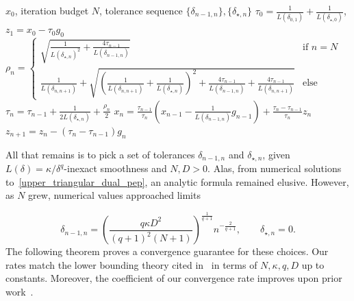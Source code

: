 \documentclass[11pt, hidelinks]{article}
\numberwithin{equation}{section}
\theoremstyle{thmstyletwo}%
\numberwithin{equation}{section}
\begin{document}
\begin{algorithm}[h]
\caption{Inexactly Smooth Optimized Gradient Method}\label{alg:IS-OGM}
\begin{algorithmic}
\Input $x_0$, iteration budget $N$, tolerance sequence $\{\delta_{n-1,n}\}, \{\delta_{\star,n}\}$
\Initialize  $\tau_0 = \frac{1}{L(\delta_{0,1})}+\frac{1}{L(\delta_{\star,0})}$, $z_1 = x_0-\tau_0 g_0$
    \State $\rho_n =  \begin{cases} 
   \sqrt{\frac{1}{L(\delta_{\star,n})^2}+\frac{4\tau_{n-1}}{L(\delta_{n-1,n})}} & \text{if } n = N  \\[1em]
 \frac{1}{L(\delta_{n,n+1})}+\sqrt{\left(\frac{1}{L(\delta_{n,n+1})}+\frac{1}{L(\delta_{\star,n})}\right)^2+\frac{4\tau_{n-1}}{L(\delta_{n-1,n})}+\frac{4\tau_{n-1}}{L(\delta_{n,n+1})}} & \text{else} 
    \end{cases}$
    \State $\tau_n = \tau_{n-1} + \frac{1}{2L(\delta_{\star,n})}+\frac{\rho_n}{2}$
    \State $x_n = \frac{\tau_{n-1}}{\tau_n}\left(x_{n-1}-\frac{1}{L(\delta_{n-1,n})}g_{n-1}\right) + \frac{\tau_n-\tau_{n-1}}{\tau_n}z_n$
    \State $z_{n+1} = z_n - (\tau_n-\tau_{n-1})g_n$
\EndFor
\end{algorithmic}
\end{algorithm}





All that remains is to pick a set of tolerances $\delta_{n-1,n}$ and $\delta_{\star, n}$, given $L(\delta) = \kappa/\delta^q$-inexact smoothness and $N,D>0$. Alas, from numerical solutions to~\eqref{upper_triangular_dual_pep}, an analytic formula remained elusive. However, as $N$ grew, numerical values approached limits 

\begin{equation}\label{eq:optimal_delta_OGM} 
    \delta_{n-1,n} = \left(\frac{q\kappa D^2}{(q+1)^2(N+1)}\right)^\frac{1}{q+1}{n^{-\frac{2}{q+1}}}, \qquad
    \delta_{\star, n} = 0.
\end{equation}
The following theorem proves a convergence guarantee for these choices. Our rates match the lower bounding theory cited in~\cite{nemierovski_optimal_HS} in terms of $N, \kappa, q, D$ up to constants. Moreover, the coefficient of our convergence rate improves upon prior work~\cite{Nesterov_2014}. 
\end{document}
